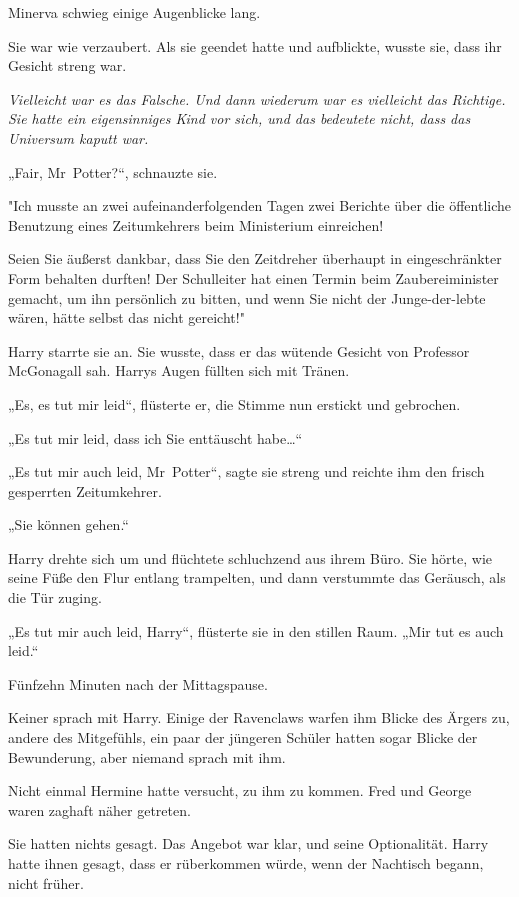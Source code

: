 {Minerva schwieg einige Augenblicke lang.

Sie war wie verzaubert. Als sie geendet hatte und aufblickte, wusste sie, dass ihr Gesicht streng war.

\emph{Vielleicht war es das Falsche. Und dann wiederum war es vielleicht das Richtige. Sie hatte ein eigensinniges Kind vor sich, und das bedeutete nicht, dass das Universum kaputt war.}

„Fair, Mr~Potter?“, schnauzte sie.

"Ich musste an zwei aufeinanderfolgenden Tagen zwei Berichte über die öffentliche Benutzung eines Zeitumkehrers beim Ministerium einreichen!

Seien Sie äußerst dankbar, dass Sie den Zeitdreher überhaupt in eingeschränkter Form behalten durften! Der Schulleiter hat einen Termin beim Zaubereiminister gemacht, um ihn persönlich zu bitten, und wenn Sie nicht der Junge-der-lebte wären, hätte selbst das nicht gereicht!"

Harry starrte sie an. Sie wusste, dass er das wütende Gesicht von Professor McGonagall sah. Harrys Augen füllten sich mit Tränen.

„Es, es tut mir leid“, flüsterte er, die Stimme nun erstickt und gebrochen.

„Es tut mir leid, dass ich Sie enttäuscht habe…“

„Es tut mir auch leid, Mr~Potter“, sagte sie streng und reichte ihm den frisch gesperrten Zeitumkehrer.

„Sie können gehen.“

Harry drehte sich um und flüchtete schluchzend aus ihrem Büro. Sie hörte, wie seine Füße den Flur entlang trampelten, und dann verstummte das Geräusch, als die Tür zuging.

„Es tut mir auch leid, Harry“, flüsterte sie in den stillen Raum. „Mir tut es auch leid.“

Fünfzehn Minuten nach der Mittagspause.

Keiner sprach mit Harry. Einige der Ravenclaws warfen ihm Blicke des Ärgers zu, andere des Mitgefühls, ein paar der jüngeren Schüler hatten sogar Blicke der Bewunderung, aber niemand sprach mit ihm.

Nicht einmal Hermine hatte versucht, zu ihm zu kommen. Fred und George waren zaghaft näher getreten.

Sie hatten nichts gesagt. Das Angebot war klar, und seine Optionalität. Harry hatte ihnen gesagt, dass er rüberkommen würde, wenn der Nachtisch begann, nicht früher.

}
